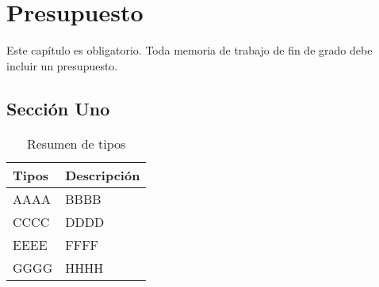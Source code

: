 \chapter{Presupuesto}
\label{ch:presupuesto}

\noindent Este capítulo es obligatorio. Toda memoria de trabajo de fin de grado debe incluir un presupuesto.

\section{Sección Uno}

\begin{table}[htbp]
    \begin{center}
        \begin{tabularx}{0.8\textwidth} { X X }
            \toprule
            \textbf{Tipos} & \textbf{Descripción} \\
            \midrule
            AAAA  & BBBB \\
            CCCC  & DDDD \\
            EEEE  & FFFF \\
            GGGG  & HHHH \\
            \bottomrule
        \end{tabularx}
    \end{center}
    \caption{Resumen de tipos}
    \label{tbl:presupuesto}
\end{table}